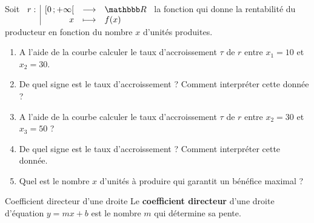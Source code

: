 \documentclass[10pt,a4paper,openany,twoside, eleve]{book}
\begin{document}
\begin{exon}
  Soit $\fonction{r}{\fo{0}{+\infty}}{\R}{x}{f(x)}$ la fonction qui donne la rentabilité du producteur en fonction du nombre $x$ d'unités produites.

  \begin{minipage}[t]{.5\textwidth}
    \vspace{-4.5cm}
    \begin{enumerate}
      \item A l'aide de la courbe calculer le taux d'accroissement $\tau$ de $r$ entre $x_1=10$ et $x_2=30$.
      \item De quel signe est le taux d'accroissement ? Comment interpréter cette donnée ?
      \item A l'aide de la courbe calculer le taux d'accroissement $\tau$ de $r$ entre $x_2=30$ et $x_3=50$ ?
      \item De quel signe est le taux d'accroissement ? Comment interpréter cette donnée.
      \item Quel est le nombre $x$ d'unités à produire qui garantit un bénéfice maximal ?
    \end{enumerate}
  \end{minipage}
  \hfill
  \begin{minipage}[t]{.5\textwidth}
    \begin{center}

    \end{center}
  \end{minipage}

  \vspace{4mm}

\end{exon}

\newpage

\begin{defi}{Coefficient directeur d'une droite}{}
  Le \textbf{coefficient directeur} d'une droite d'équation $y=mx+b$ est le nombre $m$ qui détermine sa pente.
\end{defi}
\end{document}
